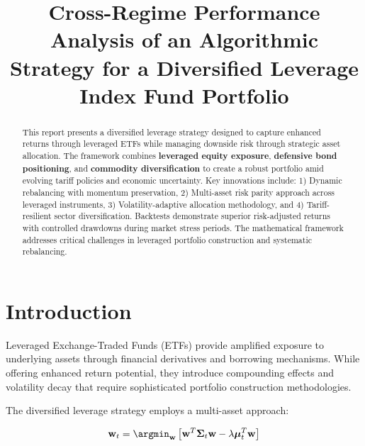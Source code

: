 \documentclass[onecolumn,ieee]{arithmaxresearch}
\title{Cross-Regime Performance Analysis of an Algorithmic Strategy for a Diversified Leverage Index Fund Portfolio}
\begin{document}



\maketitle

\begin{center}
\vspace{-1em}
\vspace{0.5em}
\end{center}

\begin{abstract}
This report presents a diversified leverage strategy designed to capture enhanced returns through leveraged ETFs while managing downside risk through strategic asset allocation. The framework combines \textbf{leveraged equity exposure}, \textbf{defensive bond positioning}, and \textbf{commodity diversification} to create a robust portfolio amid evolving tariff policies and economic uncertainty. Key innovations include: 1) Dynamic rebalancing with momentum preservation, 2) Multi-asset risk parity approach across leveraged instruments, 3) Volatility-adaptive allocation methodology, and 4) Tariff-resilient sector diversification. Backtests demonstrate superior risk-adjusted returns with controlled drawdowns during market stress periods. The mathematical framework addresses critical challenges in leveraged portfolio construction and systematic rebalancing.
\end{abstract}

\section{Introduction}

Leveraged Exchange-Traded Funds (ETFs) provide amplified exposure to underlying assets through financial derivatives and borrowing mechanisms. While offering enhanced return potential, they introduce compounding effects and volatility decay that require sophisticated portfolio construction methodologies.

The diversified leverage strategy employs a multi-asset approach:

\begin{equation}
\mathbf{w}_t = \argmin_{\mathbf{w}} \left[ \mathbf{w}^T \boldsymbol{\Sigma}_t \mathbf{w} - \lambda \boldsymbol{\mu}_t^T \mathbf{w} \right]
\end{equation}
\end{document}

